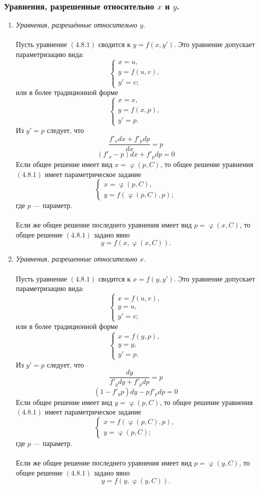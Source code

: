 \documentclass[a4paper, 12pt]{report}
\renewcommand{\varphi}{\upvarphi}
\begin{document}
\subsubsection{Уравнения, разрешенные относительно $x$ и $y$.}
\begin{enumerate}
	\item\textit{ Уравнения, разрешённые относительно $y$}.\\\\
	Пусть уравнение $(4.8.1)$ сводится к $y = f(x, y')$. Это уравнение допускает параметризацию вида:
	$$\begin{cases}
		x = u,\\
		y = f(u, v),\\
		y' = v;
	\end{cases}$$ или в более традиционной форме
	$$\begin{cases}
	x = x,\\
	y = f(x, p),\\
	y' = p.
\end{cases}$$
Из $y' = p$ следует, что
$$\frac{f'_xdx + f'_pdp}{dx} = p$$
$$(f'_x - p)dx + f'_pdp = 0$$
Если общее решение имеет вид $x = \varphi(p, C)$, то общее решение уравнения $(4.8.1)$ имеет параметрическое задание $$\begin{cases}
	x = \varphi(p, C),\\
	y = f(\varphi(p, C), p);
\end{cases}$$ где $p$ --- параметр.\\\\
Если же общее решение последнего уравнения имеет вид $p = \varphi(x, C)$, то общее решение $(4.8.1)$ задано явно $$y = f(x, \varphi(x, C)).$$
	\item\textit{ Уравнения, разрешенные относительно $x$.}\\\\
	Пусть уравнение $(4.8.1)$ сводится к $x = f(y, y')$. Это уравнение допускает параметризацию вида:
	$$\begin{cases}
		x = f(u, v),\\
		y = u,\\
		y' = v;
	\end{cases}$$ или в более традиционной форме
	$$\begin{cases}
		x = f(y, p),\\
		y = y,\\
		y' = p.
	\end{cases}$$
	Из $y' = p$ следует, что
	$$\frac{dy}{f'_ydy + f'_pdp} = p$$
	$$(1 - f'_yp)dy - pf'_pdp = 0$$
	Если общее решение имеет вид $y = \varphi(p, C)$, то общее решение уравнения $(4.8.1)$ имеет параметрическое задание $$\begin{cases}
		x = f(\varphi(p, C), p),\\
		y =  \varphi(p, C);
	\end{cases}$$ где $p$ --- параметр.\\\\
	Если же общее решение последнего уравнения имеет вид $p = \varphi(y, C)$, то общее решение $(4.8.1)$ задано явно $$y = f(y, \varphi(y, C)).$$
\end{enumerate}
\end{document}
